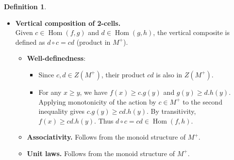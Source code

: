 \documentclass[a4paper,10pt]{article}
\theoremstyle{plain}
\theoremstyle{definition}
\newtheorem{definition}[theorem]{Definition}
\theoremstyle{remark}
\begin{document}
\begin{definition}
\begin{itemize}
            \item \textbf{Vertical composition of 2-cells.} \\
                  Given \(c \in \operatorname{Hom}(f, g)\) and \(d \in \operatorname{Hom}(g, h)\), the vertical composite is defined as \(d \circ c = cd \) (product in \(M^+\)).
                  \begin{itemize} 
                    \item \textbf{Well-definedness}:
                  \begin{itemize}
                    \item Since \(c, d \in Z(M^+)\), their product \(cd\) is also in \(Z(M^+)\).
                    \item For any \(x \geq y\), we have \(f(x) \geq c.g(y)\) and \(g(y) \geq d.h(y)\). Applying monotonicity of the action by \(c \in M^+\) to the second inequality gives \(c.g(y) \geq cd.h(y)\). By transitivity, \(f(x) \geq cd.h(y)\). Thus \(d \circ c = cd \in \operatorname{Hom}(f, h)\).
                  \end{itemize}

            \item \textbf{Associativity.} Follows from the monoid structure of \(M^+\).
          \item \textbf{Unit laws.} Follows from the monoid structure of \(M^+\).
          
                  \end{itemize}



\end{itemize}
\end{definition}
\end{document}
